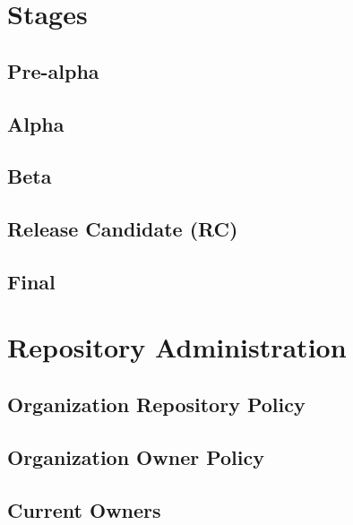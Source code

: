 \documentclass[]{book}
\begin{document}
\hypertarget{stages}{%
\section{Stages}\label{stages}}

\hypertarget{pre-alpha}{%
\subsection{Pre-alpha}\label{pre-alpha}}

\hypertarget{alpha}{%
\subsection{Alpha}\label{alpha}}

\hypertarget{beta}{%
\subsection{Beta}\label{beta}}

\hypertarget{release-candidate-rc}{%
\subsection{Release Candidate (RC)}\label{release-candidate-rc}}

\hypertarget{final}{%
\subsection{Final}\label{final}}

\hypertarget{repository-administration}{%
\section{Repository Administration}\label{repository-administration}}

\hypertarget{organization-repository-policy}{%
\subsection{Organization Repository Policy}\label{organization-repository-policy}}

\hypertarget{organization-owner-policy}{%
\subsection{Organization Owner Policy}\label{organization-owner-policy}}

\hypertarget{current-owners}{%
\subsection{Current Owners}\label{current-owners}}
\end{document}
